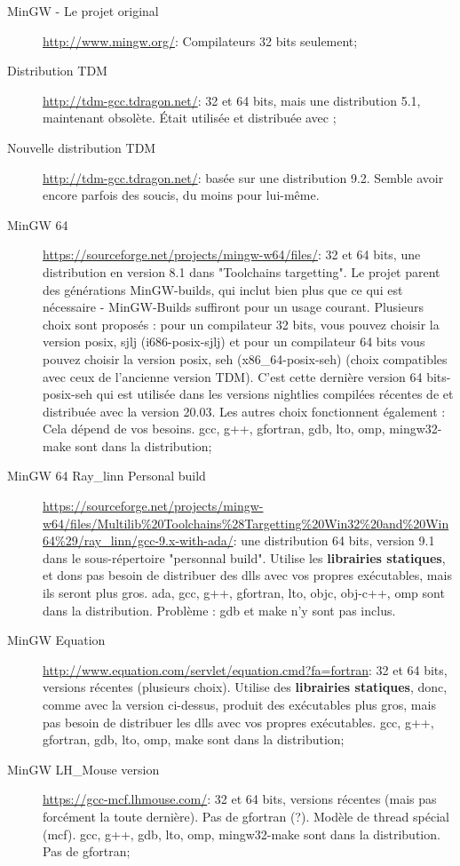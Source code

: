 \begin{description}
\item[MinGW - Le projet original] \url{http://www.mingw.org/}: Compilateurs 32 bits seulement;
\item[Distribution TDM]\url{http://tdm-gcc.tdragon.net/}: 32 et 64 bits, mais une distribution 5.1, maintenant obsolète. Était utilisée et distribuée avec ;
\item[Nouvelle distribution TDM]\url{http://tdm-gcc.tdragon.net/}: basée sur une distribution 9.2. Semble avoir encore parfois des soucis, du moins pour \codeblocks lui-même.
\item[MinGW 64] \url{https://sourceforge.net/projects/mingw-w64/files/}: 32 et 64 bits, une distribution en version 8.1 dans "Toolchains targetting". Le projet parent des générations MinGW-builds, qui inclut bien plus que ce qui est nécessaire - MinGW-Builds suffiront pour un usage courant. Plusieurs choix sont proposés : pour un compilateur 32 bits, vous pouvez choisir la version posix, sjlj (i686-posix-sjlj) et pour un compilateur 64 bits vous pouvez choisir la version posix, seh (x86\_64-posix-seh) (choix compatibles avec ceux de l'ancienne version TDM). C'est cette dernière version 64 bits-posix-seh qui est utilisée dans les versions nightlies compilées récentes de \codeblocks et distribuée avec la version 20.03. Les autres choix fonctionnent également : Cela dépend de vos besoins. gcc, g++, gfortran, gdb, lto, omp, mingw32-make sont dans la distribution;
\item[MinGW 64 Ray\_linn Personal build] \url{https://sourceforge.net/projects/mingw-w64/files/Multilib%20Toolchains%28Targetting%20Win32%20and%20Win64%29/ray_linn/gcc-9.x-with-ada/}: une distribution 64 bits, version 9.1 dans le sous-répertoire "personnal build". Utilise les \textbf{librairies statiques}, et dons pas besoin de distribuer des dlls avec vos propres exécutables, mais ils seront plus gros. ada, gcc, g++, gfortran, lto, objc, obj-c++, omp sont dans la distribution. Problème : gdb et make n'y sont pas inclus.
\item[MinGW Equation] \url{http://www.equation.com/servlet/equation.cmd?fa=fortran}: 32 et 64 bits, versions récentes (plusieurs choix). Utilise des \textbf{librairies statiques}, donc, comme avec la version ci-dessus, produit des exécutables plus gros, mais pas besoin de distribuer les dlls avec vos propres exécutables.  gcc, g++, gfortran, gdb, lto, omp, make sont dans la distribution;
\item[MinGW LH\_Mouse version] \url{https://gcc-mcf.lhmouse.com/}: 32 et 64 bits, versions récentes (mais pas forcément la toute dernière). Pas de gfortran (?). Modèle de thread spécial (mcf).  gcc, g++, gdb, lto, omp, mingw32-make sont dans la distribution. Pas de gfortran;

\end{description}
